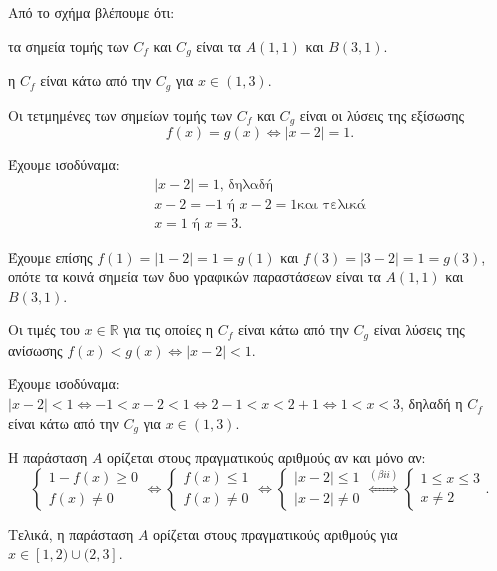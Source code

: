 
\begin{alist}
\item Από το σχήμα βλέπουμε ότι:
\begin{rlist}
\item τα σημεία τομής των $C_f$ και $C_g$ είναι τα $A(1, 1)$ και $B(3, 1)$.
\item η $C_f$ είναι κάτω από την $C_g$ για $x \in (1, 3)$.
\end{rlist}

\item
\begin{rlist}
\item Οι τετμημένες των σημείων τομής των $C_f$ και $C_g$ είναι οι λύσεις της εξίσωσης
\[f(x) = g(x) \Leftrightarrow |x - 2| = 1.\]

Έχουμε ισοδύναμα:
\begin{gather*}
|x - 2| = 1\text{, δηλαδή} \\
x - 2 = -1 \text{ ή } x - 2 = 1\text{και τελικά} \\
x = 1 \text{ ή } x = 3.
\end{gather*}

Έχουμε επίσης $f(1) = |1 - 2| = 1 = g(1)$ και $f(3) = |3 - 2| = 1 = g(3)$, οπότε τα κοινά σημεία
των δυο γραφικών παραστάσεων είναι τα $A(1, 1)$ και $B(3, 1)$.

\item Οι τιμές του $x \in \mathbb{R}$ για τις οποίες η $C_f$ είναι κάτω από την $C_g$ είναι λύσεις της
ανίσωσης $f(x) < g(x) \Leftrightarrow |x - 2| < 1$.

Έχουμε ισοδύναμα:
$|x - 2| < 1 \Leftrightarrow -1 < x - 2 < 1 \Leftrightarrow 2 - 1 < x < 2 + 1 \Leftrightarrow 1 < x < 3$, δηλαδή η $C_f$ είναι κάτω από
την $C_g$ για $x \in (1, 3)$.
\end{rlist}

\item Η παράσταση $A$ ορίζεται στους πραγματικούς αριθμούς αν και μόνο αν:
\[\begin{cases} 1 - f(x) \ge 0 \\ f(x) \ne 0 \end{cases} \Leftrightarrow \begin{cases} f(x) \le 1 \\ f(x) \ne 0 \end{cases} \Leftrightarrow \begin{cases} |x - 2| \le 1 \\ |x - 2| \ne 0 \end{cases} \stackrel{(\beta ii)}{\Leftrightarrow} \begin{cases} 1 \le x \le 3 \\ x \ne 2 \end{cases}.\]

Τελικά, η παράσταση $A$ ορίζεται στους πραγματικούς αριθμούς για $x \in [1, 2) \cup (2, 3]$.
\end{alist}

